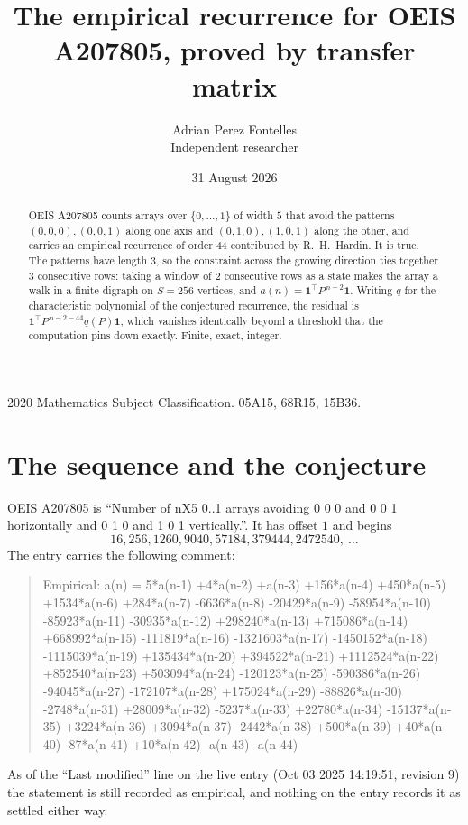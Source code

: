 \documentclass[11pt,a4paper]{article}
\title{The empirical recurrence for OEIS A207805, proved by transfer matrix}
\author{Adrian Perez Fontelles\\ \small Independent researcher}
\date{31 August 2026}
\theoremstyle{plain}
\theoremstyle{definition}
\begin{document}
\maketitle

\begin{abstract}
OEIS A207805 counts arrays over $\{0,\dots,1\}$ of width $5$ that avoid the patterns
$(0,0,0), (0,0,1)$ along one axis and $(0,1,0), (1,0,1)$ along the other, and carries an empirical recurrence of
order $44$ contributed by R.~H.~Hardin. It is true. The patterns have length $3$, so
the constraint across the growing direction ties together $3$ consecutive rows: taking a
window of $2$ consecutive rows as a state makes the array a walk in a finite digraph
on $S=256$ vertices, and $a(n)=\mathbf{1}^{\!\top}P^{\,n-2}\mathbf{1}$. Writing $q$
for the characteristic polynomial of the conjectured recurrence, the residual is
$\mathbf{1}^{\!\top}P^{\,n-2-44}q(P)\mathbf{1}$, which vanishes identically
beyond a threshold that the computation pins down exactly. Finite, exact, integer.
\end{abstract}

\noindent\small 2020 Mathematics Subject Classification. 05A15, 68R15, 15B36.\normalsize

\section{The sequence and the conjecture}

OEIS A207805 is ``Number of nX5 0..1 arrays avoiding 0 0 0 and 0 0 1 horizontally and 0 1 0 and 1 0 1 vertically.''. It has offset
$1$ and begins
\[
16, 256, 1260, 9040, 57184, 379444, 2472540,\ \dots
\]
The entry carries the following comment:
\begin{quote}\small
Empirical: a(n) = 5*a(n-1) +4*a(n-2) +a(n-3) +156*a(n-4) +450*a(n-5) +1534*a(n-6) +284*a(n-7) -6636*a(n-8) -20429*a(n-9) -58954*a(n-10) -85923*a(n-11) -30935*a(n-12) +298240*a(n-13) +715086*a(n-14) +668992*a(n-15) -111819*a(n-16) -1321603*a(n-17) -1450152*a(n-18) -1115039*a(n-19) +135434*a(n-20) +394522*a(n-21) +1112524*a(n-22) +852540*a(n-23) +503094*a(n-24) -120123*a(n-25) -590386*a(n-26) -94045*a(n-27) -172107*a(n-28) +175024*a(n-29) -88826*a(n-30) -2748*a(n-31) +28009*a(n-32) -5237*a(n-33) +22780*a(n-34) -15137*a(n-35) +3224*a(n-36) +3094*a(n-37) -2442*a(n-38) +500*a(n-39) +40*a(n-40) -87*a(n-41) +10*a(n-42) -a(n-43) -a(n-44)
\end{quote}
As of the ``Last modified'' line on the live entry (Oct 03 2025 14:19:51, revision
9) the statement is still recorded as empirical, and nothing on the entry
records it as settled either way.
\end{document}
